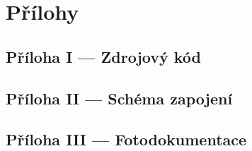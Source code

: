 \documentclass[12pt, a4paper, oneside]{report}
\begin{document}
\listoffigures
\newpage


\chapter*{Přílohy}


\section*{Příloha I --- Zdrojový kód}

\section*{Příloha II --- Schéma zapojení}

\section*{Příloha III --- Fotodokumentace}
\end{document}
